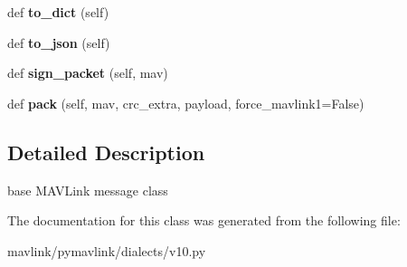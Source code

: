 \begin{DoxyCompactItemize}
def {\bfseries to\+\_\+dict} (self)
\item 
\mbox{\label{classpymavlink_1_1dialects_1_1v10_1_1MAVLink__message_af579ea5a4f98d2006e3e2aac34342eac}} 
def {\bfseries to\+\_\+json} (self)
\item 
\mbox{\label{classpymavlink_1_1dialects_1_1v10_1_1MAVLink__message_ab1eeefe6a2ae4585b26b010878890c66}} 
def {\bfseries sign\+\_\+packet} (self, mav)
\item 
\mbox{\label{classpymavlink_1_1dialects_1_1v10_1_1MAVLink__message_a3cebdc1ee4b5e117deec46dc448df2ec}} 
def {\bfseries pack} (self, mav, crc\+\_\+extra, payload, force\+\_\+mavlink1=False)
\end{DoxyCompactItemize}


\subsection{Detailed Description}
\begin{DoxyVerb}base MAVLink message class\end{DoxyVerb}
 

The documentation for this class was generated from the following file\+:\begin{DoxyCompactItemize}
\item 
mavlink/pymavlink/dialects/v10.\+py\end{DoxyCompactItemize}
